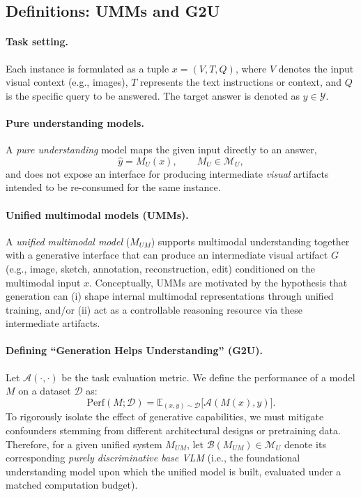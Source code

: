 \documentclass{article}
\theoremstyle{plain}
\theoremstyle{definition}
\theoremstyle{remark}
\begin{document}
\subsection{Definitions: UMMs and G2U}
\label{sec:unified_model_def}

\paragraph{Task setting.}
Each instance is formulated as a tuple $x=(V,T,Q)$, where $V$ denotes the input visual context (e.g., images), $T$ represents the text instructions or context, and $Q$ is the specific query to be answered. The target answer is denoted as $y\in\mathcal{Y}$.

\paragraph{Pure understanding models.}
A \emph{pure understanding} model maps the given input directly to an answer,
\begin{equation}
\hat{y}=M_U(x), \qquad M_U\in\mathcal{M}_U,
\end{equation}
and does not expose an interface for producing intermediate \emph{visual} artifacts intended to be re-consumed for the same instance.

\paragraph{Unified multimodal models (UMMs).}
A \emph{unified multimodal model} ($M_{UM}$) supports multimodal understanding together with a generative interface that can produce an intermediate visual artifact $G$ (e.g., image, sketch, annotation, reconstruction, edit) conditioned on the multimodal input $x$. Conceptually, UMMs are motivated by the hypothesis that generation can (i) shape internal multimodal representations through unified training, and/or (ii) act as a controllable reasoning resource via these intermediate artifacts.

\paragraph{Defining ``Generation Helps Understanding'' (G2U).}
\label{sec:g2u_def}
Let $\mathcal{A}(\cdot,\cdot)$ be the task evaluation metric. We define the performance of a model $M$ on a dataset $\mathcal{D}$ as:
\begin{equation}
\mathrm{Perf}(M;\mathcal{D})
= \mathbb{E}_{(x,y)\sim\mathcal{D}}\big[\mathcal{A}(M(x),y)\big].
\end{equation}
To rigorously isolate the effect of generative capabilities, we must mitigate confounders stemming from different architectural designs or pretraining data. Therefore, for a given unified system $M_{UM}$, let $\mathcal{B}(M_{UM}) \in \mathcal{M}_U$ denote its corresponding \emph{purely discriminative base VLM} (i.e., the foundational understanding model upon which the unified model is built, evaluated under a matched computation budget). 
\end{document}
